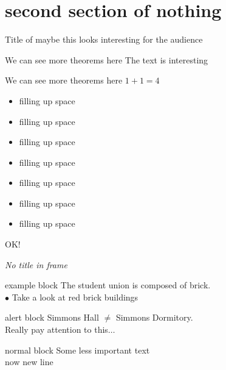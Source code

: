\documentclass{beamer}
\begin{document}
\section{second section of nothing}
\begin{frame}{Title of maybe this looks interesting for the audience}

  \begin{block}{We can see more theorems here}
    The text is interesting
  \end{block}
  \begin{block}{We can see more theorems here}
    $1+1 = 4$
    \begin{itemize}
    \item filling up space
    \item filling up space
    \item filling up space
    \item filling up space
    \item filling up space
    \item filling up space
    \item filling up space
    \end{itemize}
    OK!
  \end{block}
  
\end{frame}



\begin{frame}{}

  \emph{{\large No title in frame}}
  
  \begin{exampleblock}{example block}
    The student union is composed of brick.\\
    $\bullet$ Take a look at red brick buildings
  \end{exampleblock}
  
  \begin{alertblock}{alert block}    
    Simmons Hall $\not=$ Simmons Dormitory.
    \\
    Really pay attention to this$\ldots$
  \end{alertblock}

  \begin{block}{normal block}
    Some less important text\\
    now new line
  \end{block}
  
  
\end{frame}




\end{document}
